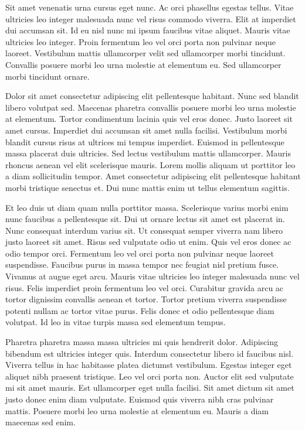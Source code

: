 \documentclass[11pt,a4paper]{article}
\begin{document}
Sit amet venenatis urna cursus eget nunc. Ac orci phasellus egestas tellus. Vitae ultricies leo integer malesuada nunc vel risus commodo viverra. Elit at imperdiet dui accumsan sit. Id eu nisl nunc mi ipsum faucibus vitae aliquet. Mauris vitae ultricies leo integer. Proin fermentum leo vel orci porta non pulvinar neque laoreet. Vestibulum mattis ullamcorper velit sed ullamcorper morbi tincidunt. Convallis posuere morbi leo urna molestie at elementum eu. Sed ullamcorper morbi tincidunt ornare.

Dolor sit amet consectetur adipiscing elit pellentesque habitant. Nunc sed blandit libero volutpat sed. Maecenas pharetra convallis posuere morbi leo urna molestie at elementum. Tortor condimentum lacinia quis vel eros donec. Justo laoreet sit amet cursus. Imperdiet dui accumsan sit amet nulla facilisi. Vestibulum morbi blandit cursus risus at ultrices mi tempus imperdiet. Euismod in pellentesque massa placerat duis ultricies. Sed lectus vestibulum mattis ullamcorper. Mauris rhoncus aenean vel elit scelerisque mauris. Lorem mollis aliquam ut porttitor leo a diam sollicitudin tempor. Amet consectetur adipiscing elit pellentesque habitant morbi tristique senectus et. Dui nunc mattis enim ut tellus elementum sagittis.

Et leo duis ut diam quam nulla porttitor massa. Scelerisque varius morbi enim nunc faucibus a pellentesque sit. Dui ut ornare lectus sit amet est placerat in. Nunc consequat interdum varius sit. Ut consequat semper viverra nam libero justo laoreet sit amet. Risus sed vulputate odio ut enim. Quis vel eros donec ac odio tempor orci. Fermentum leo vel orci porta non pulvinar neque laoreet suspendisse. Faucibus purus in massa tempor nec feugiat nisl pretium fusce. Vivamus at augue eget arcu. Mauris vitae ultricies leo integer malesuada nunc vel risus. Felis imperdiet proin fermentum leo vel orci. Curabitur gravida arcu ac tortor dignissim convallis aenean et tortor. Tortor pretium viverra suspendisse potenti nullam ac tortor vitae purus. Felis donec et odio pellentesque diam volutpat. Id leo in vitae turpis massa sed elementum tempus.

Pharetra pharetra massa massa ultricies mi quis hendrerit dolor. Adipiscing bibendum est ultricies integer quis. Interdum consectetur libero id faucibus nisl. Viverra tellus in hac habitasse platea dictumst vestibulum. Egestas integer eget aliquet nibh praesent tristique. Leo vel orci porta non. Auctor elit sed vulputate mi sit amet mauris. Est ullamcorper eget nulla facilisi. Sit amet dictum sit amet justo donec enim diam vulputate. Euismod quis viverra nibh cras pulvinar mattis. Posuere morbi leo urna molestie at elementum eu. Mauris a diam maecenas sed enim.
\end{document}
